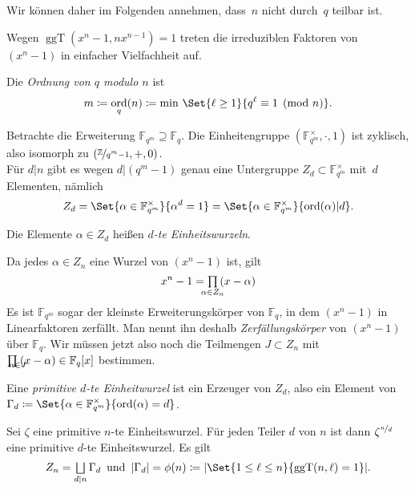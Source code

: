 \documentclass{cheat-sheet}
\newcommand{\F}{\mathbb{F}} %
\newcommand{\divides}{|} %
\DeclareMathOperator{\ggT}{ggT} %
\DeclareMathOperator{\ord}{ord} %
\begin{document}
\begin{voraussetzung}
  Wir können daher im Folgenden annehmen, dass~$n$ nicht durch~$q$ teilbar ist.
\end{voraussetzung}

\begin{bem}
  Wegen $\ggT(x^n - 1, n x^{n - 1}) = 1$ treten die irreduziblen Faktoren von $(x^n - 1)$ in einfacher Vielfachheit auf.
\end{bem}

\begin{defn}
  Die \emph{Ordnung von $q$ modulo $n$} ist
  \[
    m \coloneqq \ord_q(n) \coloneqq \min \, \Set{\ell \geq 1}{q^\ell \equiv 1 \pmod{n}}.
  \]
\end{defn}

\begin{bem}
  Betrachte die Erweiterung $\F_{q^m} \supseteq \F_q$.
  Die Einheitengruppe $(\F_{q^m}^{\times}, \cdot, 1)$ ist zyklisch, also isomorph zu $(\nicefrac{\mathbb{Z}}{q^m - 1}, +, 0)$. \\
  Für $d \divides n$ gibt es wegen $d \divides (q^m - 1)$ genau eine Untergruppe $Z_d \subset \F_{q^m}^{\times}$ mit~$d$ Elementen, nämlich
  \[
    Z_d = \Set{\alpha \in \F_{q^m}^{\times}}{\alpha^d = 1} = \Set{\alpha \in \F_{q^m}^{\times}}{\ord(\alpha) \divides d}.
  \]
\end{bem}
  
\begin{defn}
  Die Elemente $\alpha \in Z_d$ heißen \emph{$d$-te Einheitswurzeln}.
\end{defn}

\begin{bem}
  Da jedes $\alpha \in Z_n$ eine Wurzel von $(x^n - 1)$ ist, gilt
  \[
    x^n - 1 = \prod_{\mathclap{\alpha \in Z_n}} \, (x - \alpha)
  \]
  Es ist $\F_{q^m}$ sogar der kleinste Erweiterungskörper von $\F_q$, in dem $(x^n - 1)$ in Linearfaktoren zerfällt.
  Man nennt ihn deshalb \textit{Zerfällungskörper} von $(x^n - 1)$ über $\F_q$.
  Wir müssen jetzt also noch die Teilmengen $J \subset Z_n$ mit $\prod_{\mathclap{\alpha \in J}} \, (x - \alpha) \in \F_q[x]$ bestimmen.
\end{bem}

\begin{defn}
  Eine \emph{primitive $d$-te Einheitwurzel} ist ein Erzeuger von $Z_d$, also ein Element von
  $
    \Gamma_d \coloneqq \Set{\alpha \in \F_{q^m}^{\times}}{\ord(\alpha) = d}
  $.
\end{defn}

\begin{bem}
  Sei $\zeta$ eine primitive $n$-te Einheitswurzel.
  Für jeden Teiler $d$ von $n$ ist dann $\zeta^{\nicefrac{n}{d}}$ eine primitive $d$-te Einheitswurzel.
  Es gilt
  \[
    Z_n = \bigsqcup_{d \divides n} \Gamma_d
    \enspace \text{und} \enspace
    \abs{\Gamma_d} = \phi(n) \coloneqq \abs{\Set{1 \leq \ell \leq n}{\ggT(n, \ell) = 1}}.
  \]
\end{bem}
\end{document}
